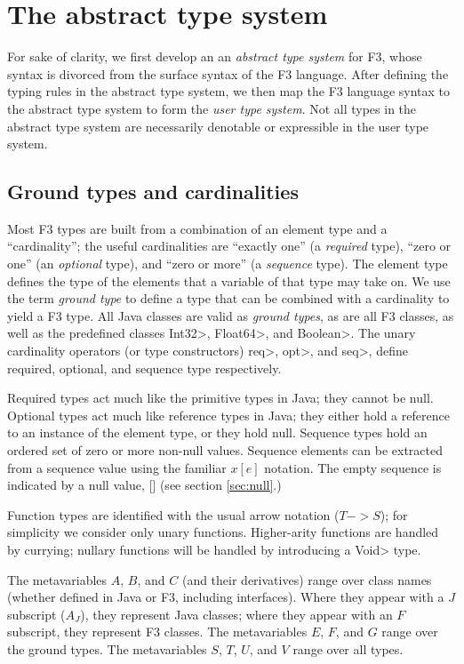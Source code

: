 \documentclass{article}
\newcommand{\sqb}{\texttt{[]}}
\begin{document}
\section{The abstract type system}

For sake of clarity, we first develop an an \emph{abstract type
system} for F3, whose syntax is divorced from the surface syntax
of the F3 language.  After defining the typing rules in the
abstract type system, we then map the F3 language syntax to the
abstract type system to form the \emph{user type system}.  Not all
types in the abstract type system are necessarily denotable or
expressible in the user type system.

\subsection{Ground types and cardinalities}

Most F3 types are built from a combination of an element type and
a ``cardinality''; the useful cardinalities are ``exactly one'' (a
\emph{required} type), ``zero or one'' (an \emph{optional} type), and
``zero or more'' (a \emph{sequence} type).  The element type defines
the type of the elements that a variable of that type may take on.  We
use the term \emph{ground type} to define a type that can be combined
with a cardinality to yield a F3 type.  All Java classes are valid
as \emph{ground types}, as are all F3 classes, as well as the
predefined classes \<Int32>, \<Float64>, and \<Boolean>.  The unary
cardinality operators (or type constructors) \<req>, \<opt>, and
\<seq>, define required, optional, and sequence type respectively.

Required types act much like the primitive types in Java; they cannot
be null.  Optional types act much like reference types in Java; they
either hold a reference to an instance of the element type, or they
hold null.  Sequence types hold an ordered set of zero or more non-null values.  
Sequence elements can be extracted from a sequence value using the familiar
$x[e]$ notation.  The empty sequence is indicated by a null value, $\sqb$ (see section \ref{sec:null}.)  

Function types are identified with the usual arrow notation ($T ->
S$); for simplicity we consider only unary functions.  Higher-arity
functions are handled by currying; nullary functions will be handled
by introducing a \<Void> type.

The metavariables $A$, $B$, and $C$ (and their derivatives) range over
class names (whether defined in Java or F3, including interfaces).  Where
they appear with a $J$ subscript ($A_J$), they represent Java classes; where they
appear with an $F$ subscript, they represent F3 classes.  
The metavariables $E$, $F$, and $G$ range over the ground types.  The
metavariables $S$, $T$, $U$, and $V$ range over all types.
\end{document}
